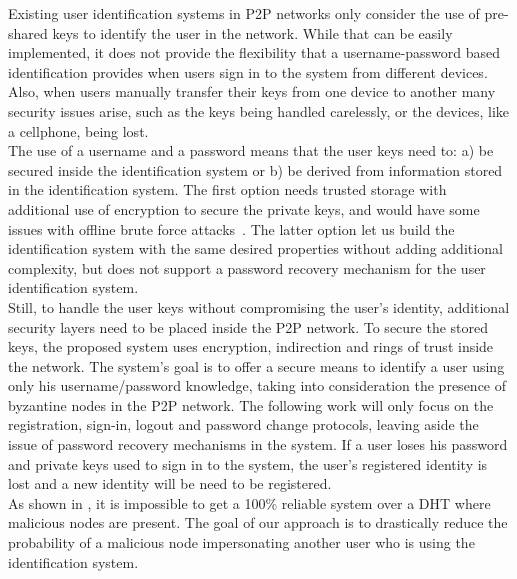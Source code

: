 Existing user identification systems in P2P networks only consider the
use of pre-shared keys to identify the user in the network. While that can
be easily implemented, it does not provide the flexibility that a
username-password based identification provides when 
users sign in to the system from different devices.
Also, when users manually transfer their keys from one device to another
many security issues arise, such as the keys being handled carelessly, or the
devices, like a cellphone, being lost.\\

The use of a username and a password means that the user keys need to: a) be
secured inside the identification system or b) be derived from information
stored in the identification system. The first option
needs trusted storage with additional use of encryption to secure the
private keys, and would have some issues with offline brute force
attacks~\cite{kreitz2012passwords}. The latter option let us build the identification system with the same desired properties without adding
additional complexity, but does not support a password recovery mechanism for the
user identification system.\\

Still, to handle the user keys without compromising the user's identity, additional
security layers need to be placed inside the P2P network.
To secure the stored keys, the proposed system uses encryption, indirection and
rings of trust inside the network. The system's goal is to offer a secure means to
identify a user using only his username/password knowledge, taking into
consideration the presence of byzantine nodes in the P2P network. The following work will only
focus on the registration, sign-in, logout and password change protocols,
leaving aside the issue of password recovery mechanisms in the system. If
a user loses his password and private keys used to sign in to the system, the
user's registered identity is lost and a new identity will be need to be registered.\\

As shown in \cite{the_sybil_attack}, it is impossible to get a 100\% reliable
system over a DHT where malicious nodes are present. 
The goal of our approach is to drastically reduce the probability of a
malicious node impersonating another user who is using the identification
system.\\


